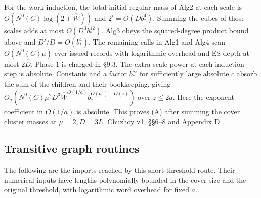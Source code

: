 \documentclass[11pt]{article}
\begin{document}
For the work induction, the total initial regular mass of Alg2 at each scale is \(O(N^0(C)\log(2+\widehat W))\) and \(2^i=O(Db_*^4)\). Summing the cubes of those scales adds at most \(O(D^3 b_*^{12})\). Alg3 obeys the squared-degree product bound above and \(D'/D=O(b_*^4)\). The remaining calls in Alg1 and Alg4 scan \(O(N^0(C)\mu)\) ever-issued records with logarithmic overhead and ES depth at most \(2\widehat D\). Phase 1 is charged in §9.3. The extra scale power at each induction step is absolute. Constants and a factor \(b_*^{c z}\) for sufficiently large absolute \(c\) absorb the sum of the children and their bookkeeping, giving \(O_a(N^0(C)\mu^2 D^3\widehat W^{O(1/a)} b_*^{O(a^2)+O(z)})\) over \(z\le2a\). Here the exponent coefficient in \(O(1/a)\) is absolute. This proves (A) after summing the cover cluster masses at \(\mu=2,D=3L\). \href{https://arxiv.org/pdf/2109.05621v1}{Chuzhoy v1, §§6--8 and Appendix D}

\hypertarget{transitive-graph-routines}{%
\subsection{Transitive graph routines}\label{transitive-graph-routines}}

The following are the imports reached by this short-threshold route. Their numerical inputs have lengths polynomially bounded in the cover size and the original threshold, with logarithmic word overhead for fixed \(a\).
\end{document}
